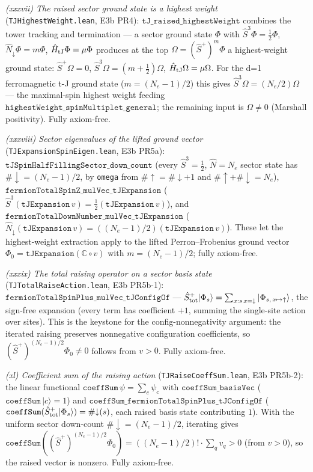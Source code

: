 \documentclass[a4paper,11pt]{article}
\begin{document}
\emph{(xxxvii) The raised sector ground state is a highest weight} (\texttt{TJHighestWeight.lean},
E3b PR4): $\texttt{tJ\_raised\_highestWeight}$ combines the tower tracking and termination --- a
sector ground state $\Phi$ with $\hat S^3\Phi=\tfrac12\Phi$, $\hat N_\downarrow\Phi=m\Phi$, $\hat
H_{\rm tJ}\Phi=\mu\Phi$ produces at the top $\Omega=(\hat S^+)^m\Phi$ a highest-weight ground state:
$\hat S^+\Omega=0$, $\hat S^3\Omega=(m+\tfrac12)\Omega$, $\hat H_{\rm tJ}\Omega=\mu\Omega$.  For the
d=1 ferromagnetic t-J ground state ($m=(N_e-1)/2$) this gives $\hat S^3\Omega=(N_e/2)\Omega$ --- the
maximal-spin highest weight feeding $\texttt{highestWeight\_spinMultiplet\_general}$; the remaining
input is $\Omega\neq 0$ (Marshall positivity).  Fully axiom-free.

\emph{(xxxviii) Sector eigenvalues of the lifted ground vector} (\texttt{TJExpansionSpinEigen.lean},
E3b PR5a): $\texttt{tJSpinHalfFillingSector\_down\_count}$ (every $\hat S^3=\tfrac12$, $\hat N=N_e$
sector state has $\#{\downarrow}=(N_e-1)/2$, by \texttt{omega} from $\#{\uparrow}=\#{\downarrow}+1$
and $\#{\uparrow}+\#{\downarrow}=N_e$), $\texttt{fermionTotalSpinZ\_mulVec\_tJExpansion}$ ($\hat
S^3(\texttt{tJExpansion}\,v)=\tfrac12(\texttt{tJExpansion}\,v)$), and
$\texttt{fermionTotalDownNumber\_mulVec\_tJExpansion}$ ($\hat N_\downarrow(\texttt{tJExpansion}\,v)
=((N_e-1)/2)(\texttt{tJExpansion}\,v)$).  These let the highest-weight extraction apply to the lifted
Perron--Frobenius ground vector $\Phi_0=\texttt{tJExpansion}(\mathbb C\circ v)$ with $m=(N_e-1)/2$;
fully axiom-free.

\emph{(xxxix) The total raising operator on a sector basis state} (\texttt{TJTotalRaiseAction.lean},
E3b PR5b-1): $\texttt{fermionTotalSpinPlus\_mulVec\_tJConfigOf}$ --- $\hat S^+_{\rm tot}|\Phi_s\rangle
= \sum_{x : s\,x=\downarrow} |\Phi_{s,\,x\mapsto\uparrow}\rangle$, the sign-free expansion (every term
has coefficient $+1$, summing the single-site action over sites).  This is the keystone for the
config-nonnegativity argument: the iterated raising preserves nonnegative configuration coefficients,
so $(\hat S^+)^{(N_e-1)/2}\Phi_0\neq 0$ follows from $v>0$.  Fully axiom-free.

\emph{(xl) Coefficient sum of the raising action} (\texttt{TJRaiseCoeffSum.lean}, E3b PR5b-2): the
linear functional $\texttt{coeffSum}\,\psi=\sum_c\psi_c$ with $\texttt{coeffSum\_basisVec}$
($\texttt{coeffSum}\,|c\rangle=1$) and $\texttt{coeffSum\_fermionTotalSpinPlus\_tJConfigOf}$
($\texttt{coeffSum}(\hat S^+_{\rm tot}|\Phi_s\rangle)=\#{\downarrow}(s)$, each raised basis state
contributing $1$).  With the uniform sector down-count $\#{\downarrow}=(N_e-1)/2$, iterating gives
$\texttt{coeffSum}((\hat S^+)^{(N_e-1)/2}\Phi_0)=((N_e-1)/2)!\cdot\sum_q v_q>0$ (from $v>0$), so the
raised vector is nonzero.  Fully axiom-free.
\end{document}
